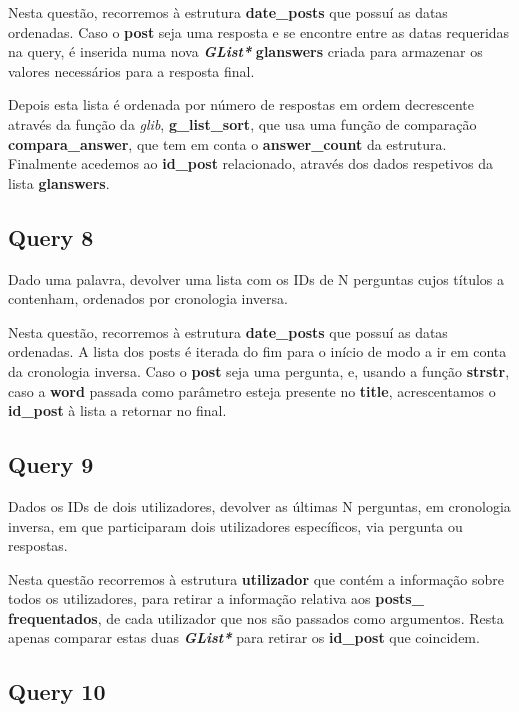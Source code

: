 \documentclass[a4paper]{article}
\begin{document}
Nesta questão, recorremos à estrutura \textbf{date\_posts} que possuí 
as datas ordenadas. Caso o \textbf{post} seja uma resposta e
se encontre entre as datas requeridas na query, é inserida numa nova
\textit{\textbf{GList*}} \textbf{glanswers} criada para armazenar os 
valores necessários para a resposta final.

Depois esta lista é ordenada por número de respostas em ordem decrescente
através da função da \textit{glib}, \textbf{g\_list\_sort}, que usa uma 
função de comparação \textbf{compara\_answer}, que tem em conta o 
\textbf{answer\_count} da estrutura. Finalmente acedemos ao \textbf{id\_post}
relacionado, através dos dados respetivos da lista \textbf{glanswers}.

\subsection{Query 8}

Dado uma palavra, devolver uma lista com os IDs de N perguntas
cujos títulos a contenham, ordenados por cronologia inversa.

Nesta questão, recorremos à estrutura \textbf{date\_posts} que possuí 
as datas ordenadas. A lista dos posts é iterada do fim para o início
de modo a ir em conta da cronologia inversa. Caso o \textbf{post} seja 
uma pergunta, e, usando a função \textbf{strstr}, caso a \textbf{word}
passada como parâmetro esteja presente no \textbf{title}, acrescentamos
o \textbf{id\_post} à lista a retornar no final.

\subsection{Query 9}

Dados os IDs de dois utilizadores, devolver as últimas N perguntas, em
cronologia inversa, em que participaram dois utilizadores específicos, 
via pergunta ou respostas.

Nesta questão recorremos à estrutura \textbf{utilizador} que contém a 
informação sobre todos os utilizadores, para retirar a informação relativa 
aos \textbf{posts\_} \textbf{frequentados}, de cada utilizador que nos são 
passados como argumentos. Resta apenas comparar estas duas 
\textit{\textbf{GList*}} para retirar os \textbf{id\_post} que coincidem.

\subsection{Query 10}
\end{document}
